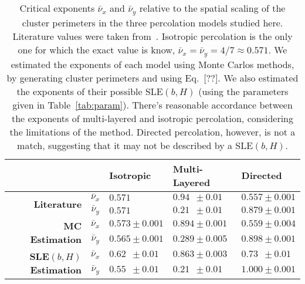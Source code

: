 \begin{table}
\begin{centering}
\begin{tabular}{rclll}
\bottomrule[0.1mm]
\toprule[0.1mm]
 &  & \textbf{Isotropic} & \textbf{Multi-Layered} & \textbf{Directed}\\
\bottomrule[0.1mm]
\multirow{2}{*}{\textbf{Literature}} & $\bar{\nu}_{x}$ & $0.571$ & $0.94\,\,\,\pm0.01$ & $0.557\pm0.001$\\
 & $\bar{\nu}_{y}$ & $0.571$ & $0.21\,\,\,\pm0.01$ & $0.879\pm0.001$\\
\bottomrule[0.1mm]
\multirow{2}{*}{\textbf{MC Estimation}} & $\bar{\nu}_{x}$ & $0.573\pm0.001$ & $0.894\pm0.001$ & $0.559\pm0.004$\\
 & $\bar{\nu}_{y}$ & $0.565\pm0.001$ & $0.289\pm0.005$ & $0.898\pm0.001$\\
\bottomrule[0.1mm]
\multirow{2}{*}{\textbf{SLE}$\left(b,H\right)$ \textbf{Estimation}} & $\bar{\nu}_{x}$ & $0.62\,\,\,\pm0.01$ & $0.863\pm0.003$ & $0.73\,\,\,\pm0.01$\\
 & $\bar{\nu}_{y}$ & $0.55\,\,\,\pm0.01$ & $0.21\,\,\,\pm0.01$ & $1.000\pm0.001$\\
\bottomrule[0.1mm]
\toprule[0.1mm]
\end{tabular}
\par\end{centering}
\caption{Critical exponents $\bar{\nu}_x$ and $\bar{\nu}_y$ relative to the
    spatial scaling of the cluster perimeters in the three percolation models
    studied here. Literature values were taken from~\cite{Ziff1986, Dayan1991,
    Owczarek1997}. Isotropic percolation is the only one for which the
    exact value is know, $\bar{\nu}_x= \bar{\nu}_y= 4/7\approx0.571$. We
    estimated the exponents of each model using Monte Carlos methods, by
    generating cluster perimeters and using Eq.~[??]. We also estimated the
    exponents of their possible SLE$(b,H)$ (using the parameters given in
    Table~\ref{tab:param}). There's reasonable accordance between the exponents
    of multi-layered and isotropic percolation, considering the limitations of
    the method. Directed percolation, however, is not a match, suggesting that
    it may not be described by a SLE$(b,H)$.}
\label{tab:nus}
\end{table}
